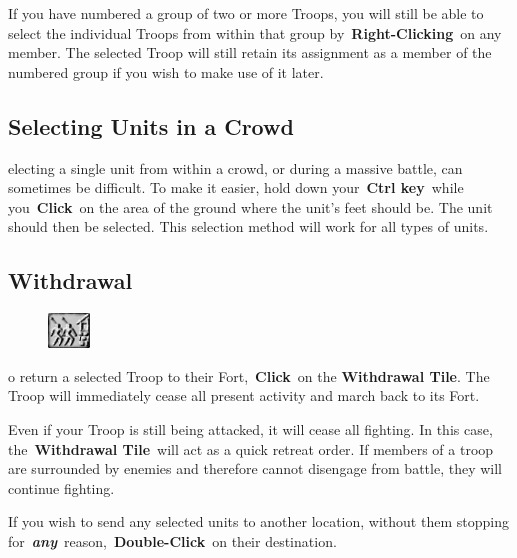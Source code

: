 If you have numbered a group of two or more Troops, you will still be able to select the individual Troops from within that group by \textbf{Right-Clicking} on any member. The selected Troop will still retain its assignment as a member of the numbered group if you wish to make use of it later.

\subsection{Selecting Units in a Crowd}


electing a single unit from within a crowd, or during a massive battle, can sometimes be difficult. To make it easier, hold down your \textbf{Ctrl key} while you \textbf{Click} on the area of the ground where the unit’s feet should be. The unit should then be selected. This selection method will work for all types of units.

\subsection{Withdrawal}


\begin{figure}
	\vspace{-20pt}
	\begin{center}
		\includegraphics[width=0.1\textwidth]{Twithdrawl}
	\end{center}
	\vspace{-20pt}
\end{figure}

o return a selected Troop to their Fort, \textbf{Click} on the \textbf{Withdrawal Tile}. The Troop will immediately cease all present activity and march back to its Fort.

Even if your Troop is still being attacked, it will cease all fighting. In this case, the \textbf{Withdrawal Tile} will act as a quick retreat order. If members of a troop are surrounded by enemies and therefore cannot disengage from battle, they will continue fighting.

If you wish to send any selected units to another location, without them stopping for \textbf{\textit{any}} reason, \textbf{Double-Click} on their destination.

